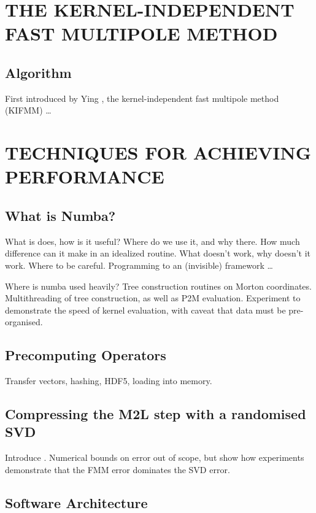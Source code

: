 \documentclass{IEEEcsmag}
\begin{document}
\section{THE KERNEL-INDEPENDENT FAST MULTIPOLE METHOD}

\subsection{Algorithm}

First introduced by Ying \cite{Ying2004}, the kernel-independent fast multipole method (KIFMM) \dots

\section{TECHNIQUES FOR ACHIEVING PERFORMANCE}

\subsection{What is Numba?}

What is does, how is it useful? Where do we use it, and why there. How much difference can it make in an idealized routine. What doesn't work, why doesn't it work. Where to be careful. Programming to an (invisible) framework \dots

Where is numba used heavily? Tree construction routines on Morton coordinates. Multithreading of tree construction, as well as P2M evaluation. Experiment to demonstrate the speed of kernel evaluation, with caveat that data must be pre-organised.

\subsection{Precomputing Operators}

Transfer vectors, hashing, HDF5, loading into memory.

\subsection{Compressing the M2L step with a randomised SVD}

Introduce \cite{Ying2004}. Numerical bounds on error out of scope, but show how experiments demonstrate that the FMM error dominates the SVD error.

\subsection{Software Architecture}
\end{document}
